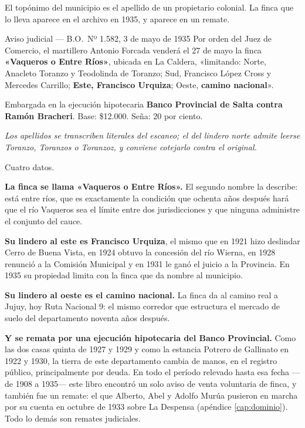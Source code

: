 El topónimo del municipio es el apellido de un propietario colonial. La finca que lo lleva
aparece en el archivo en 1935, y aparece en un remate.

\begin{ficha}{Aviso judicial --- B.O.\ Nº 1.582, 3 de mayo de 1935}
Por orden del Juez de Comercio, el martillero Antonio Forcada venderá el 27 de mayo la finca
\textbf{«Vaqueros o Entre Ríos»}, ubicada en La Caldera, «limitando: Norte, Anacleto Toranzo
y Teodolinda de Toranzo; Sud, Francisco López Cross y Mercedes Carrillo; \textbf{Este,
Francisco Urquiza}; Oeste, \textbf{camino nacional}».

Embargada en la ejecución hipotecaria \textbf{Banco Provincial de Salta contra Ramón
Bracheri}. Base: \$12.000. Seña: 20 por ciento.

\textit{Los apellidos se transcriben literales del escaneo; el del lindero norte admite
leerse Toranzo, Toranzos o Toranzoz, y conviene cotejarlo contra el original.}
\end{ficha}

Cuatro datos.

\textbf{La finca se llama «Vaqueros o Entre Ríos».} El segundo nombre la describe: está
entre ríos, que es exactamente la condición que ochenta años después hará que el río Vaqueros
sea el límite entre dos jurisdicciones y que ninguna administre el conjunto del cauce.

\textbf{Su lindero al este es Francisco Urquiza}, el mismo que en 1921 hizo deslindar Cerro
de Buena Vista, en 1924 obtuvo la concesión del río Wierna, en 1928 renunció a la Comisión
Municipal y en 1931 le ganó el juicio a la Provincia. En 1935 su propiedad limita con la
finca que da nombre al municipio.

\textbf{Su lindero al oeste es el camino nacional.} La finca da al camino real a Jujuy, hoy
Ruta Nacional 9: el mismo corredor que estructura el mercado de suelo del departamento
noventa años después.

\textbf{Y se remata por una ejecución hipotecaria del Banco Provincial.} Como las dos casas
quinta de 1927 y 1929 y como la estancia Potrero de Gallinato en 1922 y 1930, la tierra de
este departamento cambia de manos, en el registro público, principalmente por deuda. En todo el período relevado hasta esa fecha ---de 1908 a 1935--- este libro encontró un solo aviso de
venta voluntaria de finca, y también fue un remate: el que Alberto, Abel y Adolfo Murúa
pusieron en marcha por su cuenta en octubre de 1933 sobre La Despensa (apéndice
\ref{cap:dominio}). Todo lo demás son remates judiciales.

